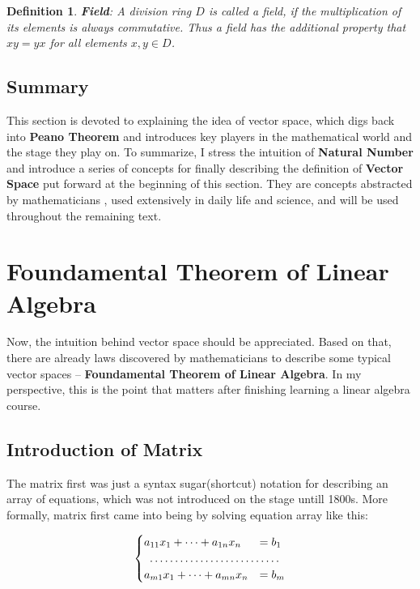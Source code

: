 \documentclass[a4paper]{book}
\newtheorem{definition}{Definition}[section]
\begin{document}
    \begin{definition}
      \textbf{Field}: A division ring $D$ is called a field, if the
      multiplication of its elements is always commutative. Thus a field has
      the additional property that $xy = yx$ for all elements $x,y \in D$.
    \end{definition}

    \subsection{Summary}
    This section is devoted to explaining the idea of vector space, which
    digs back into \textbf{Peano Theorem} and introduces key players in
    the mathematical world and the stage they play on. To summarize, I
    stress the intuition of \textbf{Natural Number} and introduce a
    series of concepts for finally describing the definition of
    \textbf{Vector Space} put forward at the beginning of this section.
    They are concepts abstracted by mathematicians , used extensively in
    daily life and science, and will be used throughout the remaining
    text.

  \section{Foundamental Theorem of Linear Algebra}

  Now, the intuition behind vector space should be appreciated.  Based
  on that, there are already laws discovered by mathematicians to
  describe some typical vector spaces -- \textbf{Foundamental Theorem of
    Linear Algebra}. In my perspective, this is the point that matters
  after finishing learning a linear algebra course.

    \subsection{Introduction of Matrix}

    The matrix first was just a syntax sugar(shortcut) notation for
    describing an array of equations, which was not introduced on the
    stage untill 1800s\cite{wiki_Matrix_(mathematics)}. More formally,
    matrix first came into being by solving equation array like this:

    \begin{align*}
      \begin{cases}
        a_{11}x_{1} +  \cdots + a_{1n}x_{n} & = b_{1}\\
          \hdotsfor{2}                              \\
        a_{m1}x_{1} +  \cdots + a_{mn}x_{n} & = b_{m}
      \end{cases}
    \end{align*}
\end{document}

